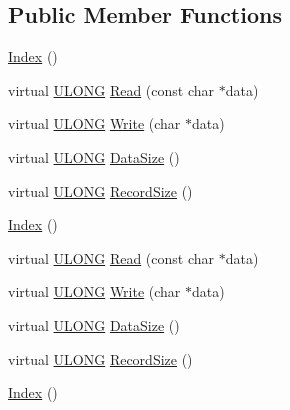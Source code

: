 \subsection*{Public Member Functions}
\begin{DoxyCompactItemize}
\item 
\hyperlink{struct_y_excel_1_1_worksheet_1_1_index_a0a8e8ce237b8452969f4fdfe850dcb92}{Index} ()
\item 
virtual \hyperlink{_basic_excel_8hpp_abe09d1bea023be6a07cbadde8e955435}{U\+L\+O\+N\+G} \hyperlink{struct_y_excel_1_1_worksheet_1_1_index_a60b520da0185c84d270adb611250a3e6}{Read} (const char $\ast$data)
\item 
virtual \hyperlink{_basic_excel_8hpp_abe09d1bea023be6a07cbadde8e955435}{U\+L\+O\+N\+G} \hyperlink{struct_y_excel_1_1_worksheet_1_1_index_a1bf27fd9906ef89cdbad63c1b5d6607a}{Write} (char $\ast$data)
\item 
virtual \hyperlink{_basic_excel_8hpp_abe09d1bea023be6a07cbadde8e955435}{U\+L\+O\+N\+G} \hyperlink{struct_y_excel_1_1_worksheet_1_1_index_aa8b53e194821f29907105bcc803e0795}{Data\+Size} ()
\item 
virtual \hyperlink{_basic_excel_8hpp_abe09d1bea023be6a07cbadde8e955435}{U\+L\+O\+N\+G} \hyperlink{struct_y_excel_1_1_worksheet_1_1_index_a4569d014aed28748caba518929d90c25}{Record\+Size} ()
\item 
\hyperlink{struct_y_excel_1_1_worksheet_1_1_index_a0a8e8ce237b8452969f4fdfe850dcb92}{Index} ()
\item 
virtual \hyperlink{_basic_excel_8hpp_abe09d1bea023be6a07cbadde8e955435}{U\+L\+O\+N\+G} \hyperlink{struct_y_excel_1_1_worksheet_1_1_index_ad35447cad444f1907273872ab7f01e4b}{Read} (const char $\ast$data)
\item 
virtual \hyperlink{_basic_excel_8hpp_abe09d1bea023be6a07cbadde8e955435}{U\+L\+O\+N\+G} \hyperlink{struct_y_excel_1_1_worksheet_1_1_index_ae5eeab9e3c418a0048bd0993e384b2bb}{Write} (char $\ast$data)
\item 
virtual \hyperlink{_basic_excel_8hpp_abe09d1bea023be6a07cbadde8e955435}{U\+L\+O\+N\+G} \hyperlink{struct_y_excel_1_1_worksheet_1_1_index_afef1acc0cc3f71d9ca9c327d3806c7c1}{Data\+Size} ()
\item 
virtual \hyperlink{_basic_excel_8hpp_abe09d1bea023be6a07cbadde8e955435}{U\+L\+O\+N\+G} \hyperlink{struct_y_excel_1_1_worksheet_1_1_index_ac4f3edeb0ea51e887e045066f09ddcb6}{Record\+Size} ()
\item 
\hyperlink{struct_y_excel_1_1_worksheet_1_1_index_a0a8e8ce237b8452969f4fdfe850dcb92}{Index} ()

\end{DoxyCompactItemize}
